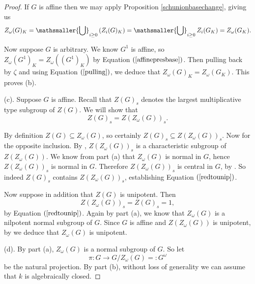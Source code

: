 \documentclass[twoside,a4paper,reqno,11pt]{amsart}
\theoremstyle{definition}
\begin{document}
\begin{proof}
\vspace{2mm}\noindent If $G$ is affine then we may apply Proposition \ref{schunionbasechange}, giving us \begin{equation}\label{affinepresbase} Z_\omega(G)_K=\mathsmaller{\bigcup}_{i\geq 0}\,(Z_i(G)_K)=\mathsmaller{\bigcup}_{i\geq 0}\,Z_i(G_K)=Z_{\omega}(G_K).\end{equation}

\vspace{1mm}\noindent Now suppose $G$ is arbitrary. We know $G^1$ is affine, so $Z_{\omega}(G^1)_K=Z_{\omega}((G^1)_K)$ by Equation $(\ref{affinepresbase})$. Then pulling back by $\zeta$ and using Equation $(\ref{pulling})$, we deduce that $Z_\omega(G)_K=Z_{\omega}(G_K)$. This proves (b).

\vspace{2mm}\noindent (c). Suppose $G$ is affine. Recall that $Z(G)_s$ denotes the largest multiplicative type subgroup of $Z(G)$. We will show that \begin{equation}\label{redtounip} Z(G)_s=Z(Z_\omega(G))_s.\end{equation}

\vspace{1mm}\noindent By definition $Z(G)\subseteq Z_\omega(G)$, so certainly $Z(G)_s\subseteq Z(Z_\omega(G))_s$. Now for the opposite inclusion. By \cite[IV, \S 3, Thm.\ 1.1(a)]{DG}, $Z(Z_\omega(G))_s$ is a characteristic subgroup of $Z(Z_\omega(G))$. We know from part (a) that $Z_\omega(G)$ is normal in $G$, hence $Z(Z_\omega(G))_s$ is normal in $G$. Therefore $Z(Z_\omega(G))_s$ is central in $G$, by \cite[Cor.\ 12.38]{Mi}. So indeed $Z(G)_s$ contains $Z(Z_\omega(G))_s$, establishing Equation $(\ref{redtounip})$. 

\vspace{2mm}\noindent Now suppose in addition that $Z(G)$ is unipotent. Then $$Z(Z_\omega(G))_s=Z(G)_s=1,$$ by Equation $(\ref{redtounip})$. Again by part (a), we know that $Z_\omega(G)$ is a nilpotent normal subgroup of $G$. Since $G$ is affine and $Z(Z_\omega(G))$ is unipotent, by \cite[IV, \S4, Thm.\ 1.10]{DG} we deduce that $Z_\omega(G)$ is unipotent. %

\vspace{2mm}\noindent (d). By part (a), $Z_\omega(G)$ is a normal subgroup of $G$. So let \begin{equation}\label{hypercentralquotient} \pi:G\to G/Z_\omega(G)=:G^\omega \end{equation} be the natural projection. By part (b), without loss of generality we can assume that $k$ is algebraically closed. 


\end{proof}
\end{document}
